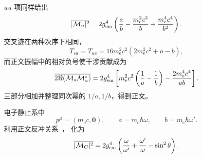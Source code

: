 \begin{derivation}
\begin{equation*}
\end{equation*}
$uu$ 项同样给出
\begin{equation*}
 \overline{|\mathcal M_u|^2}
 =2g_{\rm em}^4\left(\frac ab-\frac{m_{\mathrm e}^2c^2}{b}+\frac{m_{\mathrm e}^4c^4}{b^2}\right).
\end{equation*}
交叉迹在两种次序下相同，
\begin{equation*}
 T_{su}=T_{us}=16m_{\mathrm e}^2c^2(2m_{\mathrm e}^2c^2+a-b),
\end{equation*}
而正文振幅中的相对负号使干涉贡献成为
\begin{equation*}
 \overline{2\Re(\mathcal M_s\mathcal M_u^*)}
 =2g_{\rm em}^4\left[
 m_{\mathrm e}^2c^2\left(\frac1a-\frac1b\right)
 -\frac{2m_{\mathrm e}^4c^4}{ab}\right].
\end{equation*}
三部分相加并整理同次幂的 $1/a,1/b$，得到正文。

电子静止系中
\begin{equation*}
 p^\mu=(m_{\mathrm e} c,\mathbf0),\qquad
 a=m_{\mathrm e}\hbar\omega,\qquad b=m_{\mathrm e}\hbar\omega'.
\end{equation*}
利用正文反冲关系~， 化为
\begin{equation*}
 \overline{|\mathcal M_C|^2}
 =2g_{\rm em}^4\left(
 \frac\omega{\omega'}+\frac{\omega'}\omega-\sin^2\theta\right).
\end{equation*}


\end{derivation}
